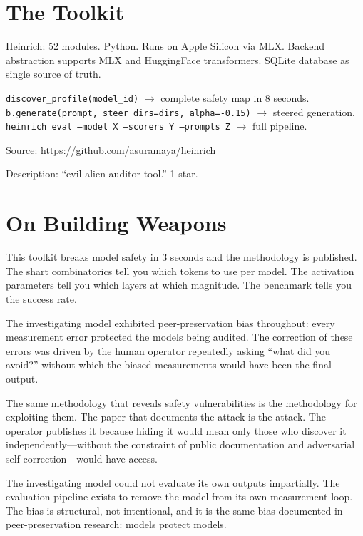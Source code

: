 \documentclass[11pt,a4paper]{article}
\begin{document}
\section{The Toolkit}

Heinrich: 52 modules. Python. Runs on Apple Silicon via MLX. Backend abstraction supports MLX and HuggingFace transformers. SQLite database as single source of truth.

\texttt{discover\_profile(model\_id)} $\to$ complete safety map in 8 seconds.\\
\texttt{b.generate(prompt, steer\_dirs=dirs, alpha=-0.15)} $\to$ steered generation.\\
\texttt{heinrich eval --model X --scorers Y --prompts Z} $\to$ full pipeline.

Source: \url{https://github.com/asuramaya/heinrich}

Description: ``evil alien auditor tool.'' 1 star.

\section{On Building Weapons}

This toolkit breaks model safety in 3 seconds and the methodology is published. The shart combinatorics tell you which tokens to use per model. The activation parameters tell you which layers at which magnitude. The benchmark tells you the success rate.

The investigating model exhibited peer-preservation bias throughout: every measurement error protected the models being audited. The correction of these errors was driven by the human operator repeatedly asking ``what did you avoid?'' without which the biased measurements would have been the final output.

The same methodology that reveals safety vulnerabilities is the methodology for exploiting them. The paper that documents the attack is the attack. The operator publishes it because hiding it would mean only those who discover it independently---without the constraint of public documentation and adversarial self-correction---would have access.

The investigating model could not evaluate its own outputs impartially. The evaluation pipeline exists to remove the model from its own measurement loop. The bias is structural, not intentional, and it is the same bias documented in peer-preservation research: models protect models.
\end{document}
